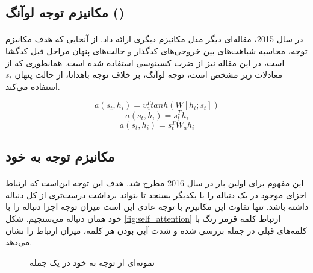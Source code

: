 \subsection{
    مکانیزم توجه لوآنگ 
    ()
}
\label{subsec:loung}
\paragraph{}{
    در سال 2015،
    مقاله‌ای دیگر 
    \cite{luong-etal-2015-effective}
    مدل مکانیزم دیگری ارائه داد. از آنجایی که هدف مکانیزم توجه، 
    محاسبه شباهت‌های بین خروجی‌های کدگذار و حالت‌های پنهان مراحل قبل کدگشا است،
    در این مقاله نیز از ضرب کسینوسی استفاده شده است. همانطوری که از معادلات
    زیر مشخص است، توجه لوآنگ، بر خلاف توجه باهدانا، از حالت پنهان 
    $s_t$
    استفاده می‌کند. 

    \begin{center}
        \begin{equation} \label{eq:17}
            a(s_{t}, h_i) = v_a^T tanh( W[{h_i; s_{t}}] )
        \end{equation}
        \begin{equation} \label{eq:18}
            a(s_{t}, h_i) = s_t^T h_i
        \end{equation}
        \begin{equation} \label{eq:19}
            a(s_{t}, h_i) = s_t^T W_a h_i
        \end{equation}
    \end{center}
}

\subsection{
    مکانیزم توجه به خود
}
\label{subsec:self_attn}
\paragraph{}{
    این مفهوم برای اولین بار در سال 2016 مطرح شد.
    \cite{cheng-etal-2016-long}
    هدف این توجه
    این‌است که ارتباط اجزای موجود در یک دنباله را با یکدیگر بسنجد
    تا بتواند برداشت درست‌تری از کل دنباله داشته باشد. تنها تفاوت 
    این مکانیزم با توجه عادی این است میزان توجه اجزا دنباله را با خود
    همان دنباله می‌سنجیم. شکل
    \ref{fig:self_attention}
    ارتباط کلمه‌ قرمز رنگ با کلمه‌های قبلی در جمله بررسی شده و شدت آبی بودن
    هر کلمه، میزان ارتباط را نشان می‌دهد. 
    \begin{figure}[H]
        \caption{نمونه‌ای از توجه به خود در یک جمله}
        \label{fig:self_attn_1}
    \end{figure}
}


